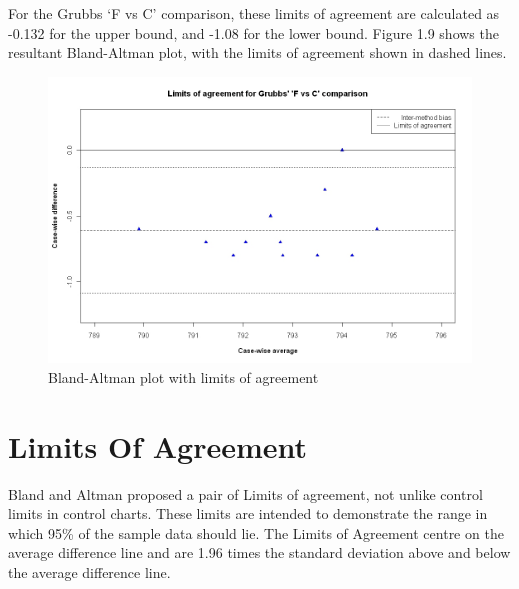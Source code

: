 \documentclass[12pt, a4paper]{report}
\theoremstyle{plain}
\theoremstyle{definition}
\theoremstyle{remark}
\begin{document}
	
	
	For the Grubbs `F vs C' comparison, these limits
	of agreement are calculated as -0.132 for the upper bound, and
	-1.08 for the lower bound. Figure 1.9 shows the resultant
	Bland-Altman plot, with the limits of agreement shown in dashed
	lines.
	
	
	\begin{figure}[h!]
		\begin{center}
			\includegraphics[width=125mm]{images/GrubbsBAplot-LOA.jpeg}
			\caption{Bland-Altman plot with limits of agreement}\label{GrubbsBAplot-noLOA}
		\end{center}
	\end{figure}

	

	\section{Limits Of Agreement}
	Bland and Altman proposed a pair of Limits of agreement, not unlike control limits in control charts. These
	limits are intended to demonstrate the range in which 95\% of the sample data should lie. The Limits of Agreement centre on the
	average difference line and are 1.96 times the standard deviation above and below the average difference line.
	
\end{document}
